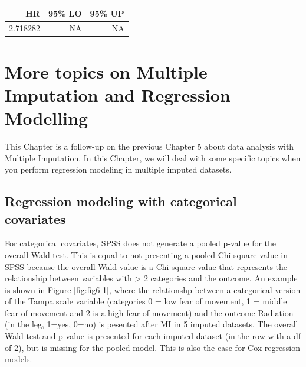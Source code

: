 \documentclass[
]{book}
\begin{document}
\begin{tabular}{r|r|r}
\hline
HR & 95\% LO & 95\% UP\\
\hline
2.718282 & NA & NA\\
\hline
\end{tabular}

\hypertarget{more-topics-on-multiple-imputation-and-regression-modelling}{%
\chapter{More topics on Multiple Imputation and Regression Modelling}\label{more-topics-on-multiple-imputation-and-regression-modelling}}

This Chapter is a follow-up on the previous Chapter 5 about data analysis with Multiple Imputation. In this Chapter, we will deal with some specific topics when you perform regression modeling in multiple imputed datasets.

\hypertarget{regression-modeling-with-categorical-covariates}{%
\section{Regression modeling with categorical covariates}\label{regression-modeling-with-categorical-covariates}}

For categorical covariates, SPSS does not generate a pooled p-value for the overall Wald test. This is equal to not presenting a pooled Chi-square value in SPSS because the overall Wald value is a Chi-square value that represents the relationship between variables with \textgreater{} 2 categories and the outcome. An example is shown in Figure \ref{fig:fig6-1}, where the relationshp between a categorical version of the Tampa scale variable (categories 0 = low fear of movement, 1 = middle fear of movement and 2 is a high fear of movement) and the outcome Radiation (in the leg, 1=yes, 0=no) is pesented after MI in 5 imputed datasets. The overall Wald test and p-value is presented for each imputed dataset (in the row with a df of 2), but is missing for the pooled model. This is also the case for Cox regression models.
\end{document}
